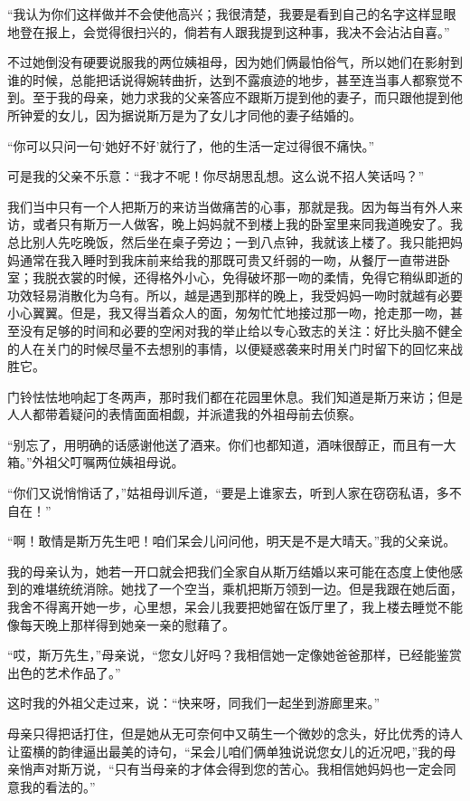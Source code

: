 \par “我认为你们这样做并不会使他高兴；我很清楚，我要是看到自己的名字这样显眼地登在报上，会觉得很扫兴的，倘若有人跟我提到这种事，我决不会沾沾自喜。”
\par 不过她倒没有硬要说服我的两位姨祖母，因为她们俩最怕俗气，所以她们在影射到谁的时候，总能把话说得婉转曲折，达到不露痕迹的地步，甚至连当事人都察觉不到。至于我的母亲，她力求我的父亲答应不跟斯万提到他的妻子，而只跟他提到他所钟爱的女儿，因为据说斯万是为了女儿才同他的妻子结婚的。
\par “你可以只问一句‘她好不好’就行了，他的生活一定过得很不痛快。”
\par 可是我的父亲不乐意：“我才不呢！你尽胡思乱想。这么说不招人笑话吗？”
\par 我们当中只有一个人把斯万的来访当做痛苦的心事，那就是我。因为每当有外人来访，或者只有斯万一人做客，晚上妈妈就不到楼上我的卧室里来同我道晚安了。我总比别人先吃晚饭，然后坐在桌子旁边；一到八点钟，我就该上楼了。我只能把妈妈通常在我入睡时到我床前来给我的那既可贵又纤弱的一吻，从餐厅一直带进卧室；我脱衣裳的时候，还得格外小心，免得破坏那一吻的柔情，免得它稍纵即逝的功效轻易消散化为乌有。所以，越是遇到那样的晚上，我受妈妈一吻时就越有必要小心翼翼。但是，我又得当着众人的面，匆匆忙忙地接过那一吻，抢走那一吻，甚至没有足够的时间和必要的空闲对我的举止给以专心致志的关注：好比头脑不健全的人在关门的时候尽量不去想别的事情，以便疑惑袭来时用关门时留下的回忆来战胜它。
\par 门铃怯怯地响起丁冬两声，那时我们都在花园里休息。我们知道是斯万来访；但是人人都带着疑问的表情面面相觑，并派遣我的外祖母前去侦察。
\par “别忘了，用明确的话感谢他送了酒来。你们也都知道，酒味很醇正，而且有一大箱。”外祖父叮嘱两位姨祖母说。
\par “你们又说悄悄话了，”姑祖母训斥道，“要是上谁家去，听到人家在窃窃私语，多不自在！”
\par “啊！敢情是斯万先生吧！咱们呆会儿问问他，明天是不是大晴天。”我的父亲说。
\par 我的母亲认为，她若一开口就会把我们全家自从斯万结婚以来可能在态度上使他感到的难堪统统消除。她找了一个空当，乘机把斯万领到一边。但是我跟在她后面，我舍不得离开她一步，心里想，呆会儿我要把她留在饭厅里了，我上楼去睡觉不能像每天晚上那样得到她亲一亲的慰藉了。
\par “哎，斯万先生，”母亲说，“您女儿好吗？我相信她一定像她爸爸那样，已经能鉴赏出色的艺术作品了。”
\par 这时我的外祖父走过来，说：“快来呀，同我们一起坐到游廊里来。”
\par 母亲只得把话打住，但是她从无可奈何中又萌生一个微妙的念头，好比优秀的诗人让蛮横的韵律逼出最美的诗句，“呆会儿咱们俩单独说说您女儿的近况吧，”我的母亲悄声对斯万说，“只有当母亲的才体会得到您的苦心。我相信她妈妈也一定会同意我的看法的。”
